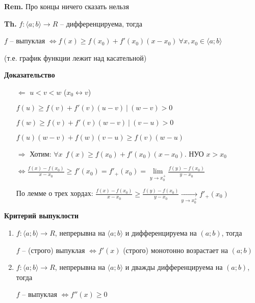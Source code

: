 \documentclass[14pt, letter paper]{article}
\newcommand{\q}[1]{\langle #1 \rangle}
\begin{document}
\textbf{Rem.} Про концы ничего сказать нельзя

\vspace{10mm}

\textbf{Th.} $f : \q{a; b} \rightarrow R$ -- дифференцируема, тогда

$f$ -- выпуклая $\Leftrightarrow f(x) \geq f(x_0) + f'(x_0)(x - x_0)\ \forall x, x_0 \in \q{a; b}$

(т.е. график функции лежит над касательной)

\vspace{5mm}

\begin{center}
    \textbf{Доказательство}
\end{center}

\begin{itemize}
    \item[$\Leftarrow$] $u < v < w$ ($x_0 \leftrightarrow v$)
    
    $f(u) \geq f(v) + f'(v)(u - v)\ |\ (w - v) > 0$

    $f(w) \geq f(v) + f'(v)(w - v)\ |\ (v - u) > 0$

    $f(u)(w - v) + f(w)(v - u) \geq f(v)(w - u)$

    \item[$\Rightarrow$] Хотим: $\forall x\ \ f(x) \geq f(x_0) + f'(x_0)(x - x_0)$. НУО $x > x_0$
    
    $\Leftrightarrow \frac{f(x) - f(x_0)}{x - x_0} \geq f'(x_0) = f'_+(x_0) = \lim\limits_{y \rightarrow x_0^+} \frac{f(y) - f(x_0)}{y - x_0}$

    По лемме о трех хордах: $\frac{f(x) - f(x_0)}{x - x_0} \geq \frac{f(y) - f(x_0)}{y - x_0} \xrightarrow[y \rightarrow x_0^+]{} f'_+(x_0)$
\end{itemize}

\vspace{5mm}

\textbf{Критерий выпуклости}

\begin{enumerate}
    \item $f : \q{a; b} \rightarrow R$, непрерывна на $\q{a; b}$ и дифференцируема на $(a; b)$, тогда
    
    $f$ -- (строго) выпуклая $\Leftrightarrow f'(x)$ (строго) монотонно возрастает на $(a; b)$

    \item $f : \q{a; b} \rightarrow R$, непрерывна на $\q{a; b}$ и дважды дифференцируема на $(a; b)$, тогда
    
    $f$ -- выпуклая $\Leftrightarrow f''(x) \geq 0$ 
\end{enumerate}
\end{document}
